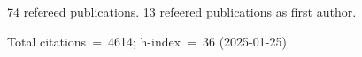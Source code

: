 74 refereed publications. 13 refeered publications as first author.

Total citations~=~4614; h-index~=~36 (2025-01-25)
